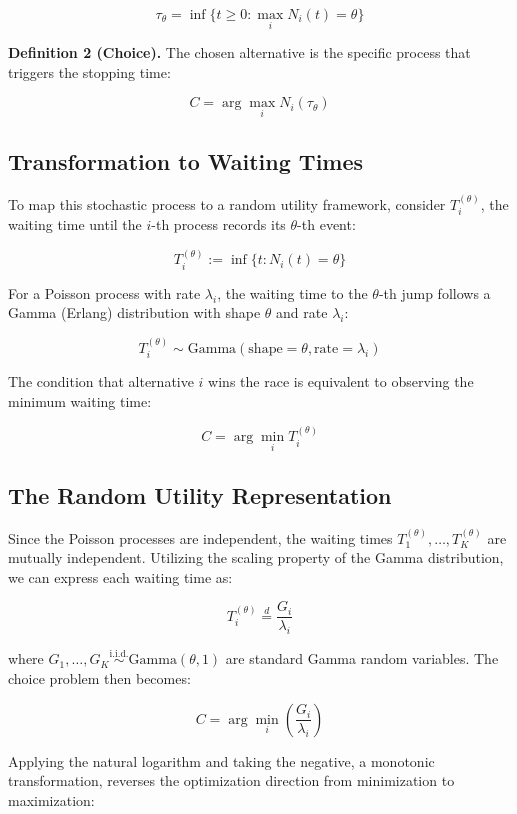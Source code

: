 \documentclass[
  man,
  floatsintext,
  longtable,
  a4paper,
  nolmodern,
  notxfonts,
  notimes,
  colorlinks=true,linkcolor=blue,citecolor=blue,urlcolor=blue]{apa7}
\begin{document}
\[
\tau_{\theta} = \inf \{t \ge 0 : \max_{i} N_i(t) = \theta \}
\]

\textbf{Definition 2 (Choice).} The chosen alternative is the specific
process that triggers the stopping time:

\[
C = \arg \max_{i} N_i(\tau_{\theta})
\]

\subsection{Transformation to Waiting
Times}\label{transformation-to-waiting-times}

To map this stochastic process to a random utility framework, consider
\(T_i^{(\theta)}\), the waiting time until the \(i\)-th process records
its \(\theta\)-th event:

\[
T_i^{(\theta)} := \inf \{t : N_i(t) = \theta \}
\]

For a Poisson process with rate \(\lambda_i\), the waiting time to the
\(\theta\)-th jump follows a Gamma (Erlang) distribution with shape
\(\theta\) and rate \(\lambda_i\):

\[
T_i^{(\theta)} \sim \text{Gamma}(\text{shape}=\theta, \text{rate}=\lambda_i)
\]

The condition that alternative \(i\) wins the race is equivalent to
observing the minimum waiting time:

\[
C = \arg \min_{i} T_i^{(\theta)}
\]

\subsection{The Random Utility
Representation}\label{the-random-utility-representation}

Since the Poisson processes are independent, the waiting times
\(T_1^{(\theta)}, \ldots, T_K^{(\theta)}\) are mutually independent.
Utilizing the scaling property of the Gamma distribution, we can express
each waiting time as:

\[
T_i^{(\theta)} \stackrel{d}{=} \frac{G_i}{\lambda_i}
\]

where
\(G_1, \ldots, G_K \stackrel{\text{i.i.d.}}{\sim} \text{Gamma}(\theta, 1)\)
are standard Gamma random variables. The choice problem then becomes:

\[
C = \arg \min_{i} \left( \frac{G_i}{\lambda_i} \right)
\]

Applying the natural logarithm and taking the negative, a monotonic
transformation, reverses the optimization direction from minimization to
maximization:
\end{document}
